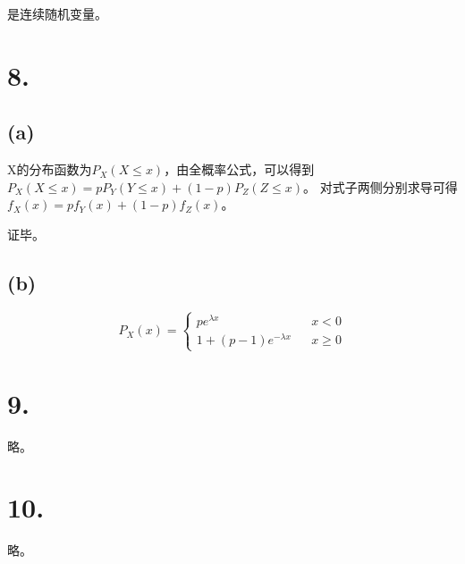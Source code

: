 \documentclass[UTF8]{report}
\begin{document}
            是连续随机变量。
    \section*{8.}
        \subsection*{(a)}
            X的分布函数为$P_X(X \leq x)$，由全概率公式，可以得到$P_X(X \leq x) = pP_Y(Y \leq x) + (1 - p)P_Z(Z \leq x)$。
            对式子两侧分别求导可得$f_X(x) = pf_Y(x) + (1 - p)f_Z(x)$。

            证毕。
        \subsection*{(b)}
            $$P_X(x) = \left\{
                \begin{array}{lcr}
                    pe^{\lambda x} & & x < 0\\
                    1 + (p - 1)e^{-\lambda x} & & x \geq 0
                \end{array}
            \right.$$
    \section*{9.}
        略。
    \section*{10.}
        略。
\end{document}
